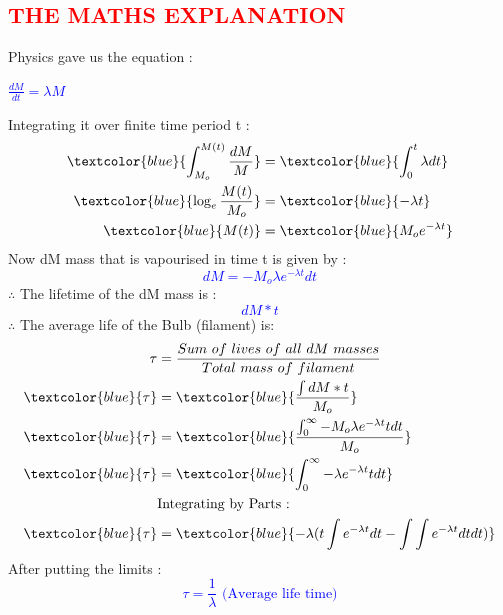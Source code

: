 \documentclass[a4paper]{article}
\begin{document}
\subsection{\textcolor{red}{\huge{THE MATHS EXPLANATION}}}
\Large{Physics gave us the equation :}
\begin{center}
\textcolor{blue}{\huge{$\frac{dM}{dt}=\lambda M$}}
\end{center}
Integrating it over finite time period t :
\begin{equation*}
\begin{aligned}
\textcolor{blue}{\huge{\int^{M(t)}_{M
_o} \frac{dM}{M}}} &=\textcolor{blue}{\huge{ \int^t_0 \lambda dt}}\\
\textcolor{blue}{\huge{\log_e{\frac{M(t)}{M_o}}}} &=\textcolor{blue}{\huge{- \lambda t}}\\
\textcolor{blue}{\huge{M(t)}}&=\textcolor{blue}{\huge{M_o e^{-\lambda t}}}
\end{aligned}
\end{equation*}
\Large{Now dM mass that is vapourised in time t is given by :}
\textcolor{blue}{\huge{$$dM = - M_o \lambda e^{-\lambda t} dt$$}}
$\therefore$ The lifetime of the dM mass is :
\textcolor{blue}{\huge{$$dM*t$$}}
$\therefore$ The average life of the Bulb (filament) is:
\begin{equation*}
\begin{aligned}
\tau &= \frac{Sum \mbox{ } of \mbox{ } lives \mbox{ } of \mbox{ } all \mbox{ } dM \mbox{ } masses}{Total \mbox{ } mass \mbox{ } of \mbox{ } filament}\\
\textcolor{blue}{\tau}&=\textcolor{blue}{\frac{\int dM*t}{M_o}}\\
\textcolor{blue}{\tau}&=\textcolor{blue}{\frac{\int^\infty_0 -M_o\lambda e^{-\lambda t} t dt}{M_o}}\\
\textcolor{blue}{\tau}&=\textcolor{blue}{\int^\infty_0 -\lambda e^{-\lambda t} t dt}\\
&\mbox{Integrating by Parts : }\\
\textcolor{blue}{\tau}&=\textcolor{blue}{-\lambda (t \int e^{-\lambda t} dt - \int \int e^{-\lambda t}dt dt)}\\
\end{aligned}
\end{equation*}
\newpage
After putting the limits : 
\textcolor{blue}{$$\tau=\frac{1}{\lambda}\mbox{ (Average life time)}$$}
\end{document}
